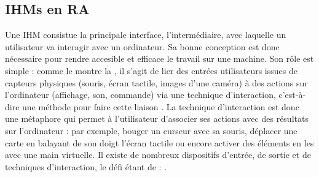 \subsection{IHMs en RA}
\label{subsec:litterature_ar_hci_presentation}
Une IHM consistue la principale interface, l'intermédiaire, avec laquelle un utilisateur va interagir avec un ordinateur. Sa bonne conception est donc nécessaire pour rendre accesible et efficace le travail sur une machine. Son rôle est simple : comme le montre la , il s'agit de lier des entrées utilisateurs issues de capteurs physiques (souris, écran tactile, images d'une caméra) à des actions sur l'ordinateur (affichage, son, commande) via une technique d'interaction, c'est-à-dire une méthode pour faire cette liaison \citep{Billinghurst2005}. La technique d'interaction est donc une métaphore qui permet à l'utilisateur d'associer ses actions avec des résultats sur l'ordinateur : par exemple, bouger un curseur avec sa souris, déplacer une carte en balayant de son doigt l'écran tactile ou encore activer des éléments en les  avec une main virtuelle. Il existe de nombreux dispositifs d'entrée, de sortie et de techniques d'interaction, le défi étant de :  \citep{Billinghurst2005}.


